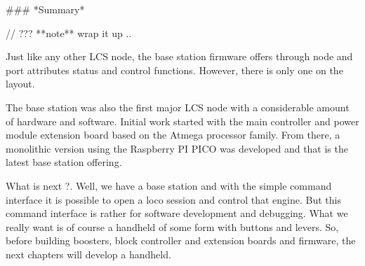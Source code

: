 ### *Summary*

// ??? **note** wrap it up ..

Just like any other LCS node, the base station firmware offers through node and port attributes status and control functions. However, there is only one on the layout.

The base station was also the first major LCS node with a considerable amount of hardware and software. Initial work started with the main controller and power module extension board based on the Atmega processor family. From there, a monolithic version using the Raspberry PI PICO was developed and that is the latest base station offering.

What is next ?. Well, we have a base station and with the simple command interface it is possible to open a loco session and control that engine. But this command interface is rather for software development and debugging. What we really want is of course a handheld of some form with buttons and levers. So, before building boosters, block controller and extension boards and firmware, the next chapters will develop a handheld. 
